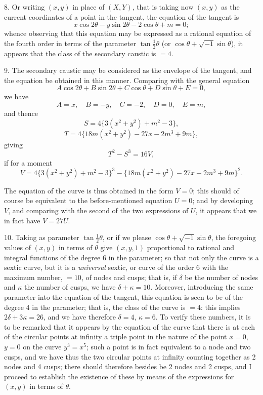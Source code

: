 \documentclass[11pt,a4paper]{article}
\theoremstyle{plain}
\begin{document}
8. Or writing $(x, y)$ in place of $(X, Y)$, that is taking now $(x, y)$ as the current coordinates of a point in the tangent, the equation of the tangent is
\[
x\cos 2\theta - y\sin 2\theta - 2\cos\theta + m = 0;
\]
whence observing that this equation may be expressed as a rational equation of the fourth order in terms of the parameter $\tan\frac12\theta$ (or $\cos\theta + \sqrt{-1}\sin\theta$), it appears that the class of the secondary caustic is $= 4$.

9. The secondary caustic may be considered as the envelope of the tangent, and the equation be obtained in this manner. Comparing with the general equation
\[
A\cos 2\theta + B\sin 2\theta + C\cos\theta + D\sin\theta + E = 0,
\]
we have
\[
A = x, \quad B = -y, \quad C = -2, \quad D = 0, \quad E = m,
\]
and thence
\[
S = 4\{3(x^2 + y^2) + m^2 - 3\},
\]
\[
T = 4\{18m(x^2 + y^2) - 27x - 2m^3 + 9m\},
\]
giving
\[
T^2 - S^3 = 16V,
\]
if for a moment
\[
V = 4\{3(x^2 + y^2) + m^2 - 3\}^3 - \{18m(x^2 + y^2) - 27x - 2m^3 + 9m\}^2.
\]

The equation of the curve is thus obtained in the form $V = 0$; this should of course be equivalent to the before-mentioned equation $U = 0$; and by developing $V$, and comparing with the second of the two expressions of $U$, it appears that we in fact have $V = 27U$.

10. Taking as parameter $\tan\frac12\theta$, or if we please $\cos\theta + \sqrt{-1}\sin\theta$, the foregoing values of $(x, y)$ in terms of $\theta$ give $(x, y, 1)$ proportional to rational and integral functions of the degree 6 in the parameter; so that not only the curve is a sextic curve, but it is a \textit{universal} sextic, or curve of the order 6 with the maximum number, $= 10$, of nodes and cusps; that is, if $\delta$ be the number of nodes and $\kappa$ the number of cusps, we have $\delta + \kappa = 10$. Moreover, introducing the same parameter into the equation of the tangent, this equation is seen to be of the degree 4 in the parameter; that is, the class of the curve is $= 4$: this implies $2\delta + 3\kappa = 26$, and we have therefore $\delta = 4$, $\kappa = 6$. To verify these numbers, it is to be remarked that it appears by the equation of the curve that there is at each of the circular points at infinity a triple point in the nature of the point $x = 0$, $y = 0$ on the curve $y^3 = x^5$; such a point is in fact equivalent to a node and two cusps, and we have thus the two circular points at infinity counting together as 2 nodes and 4 cusps; there should therefore besides be 2 nodes and 2 cusps, and I proceed to establish the existence of these by means of the expressions for $(x, y)$ in terms of $\theta$.
\end{document}
